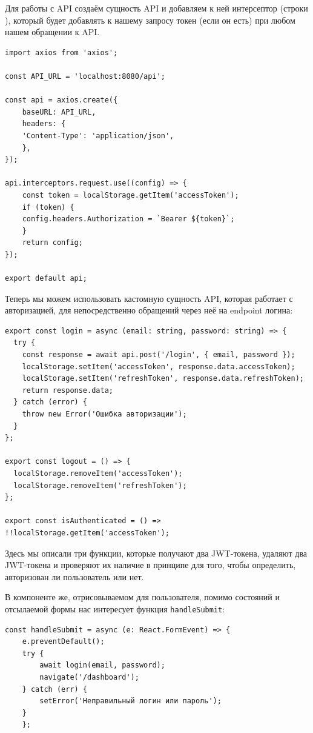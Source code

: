 \documentclass[diploma]{SCWorks}
\begin{document}
Для работы с API создаём сущность API и добавляем к ней интерсептор 
(строки ), который
будет добавлять к нашему запросу токен (если он есть) при любом нашем обращении
к API.

\begin{verbatim}
import axios from 'axios';

const API_URL = 'localhost:8080/api';

const api = axios.create({
    baseURL: API_URL,
    headers: {
    'Content-Type': 'application/json',
    },
});

api.interceptors.request.use((config) => {
    const token = localStorage.getItem('accessToken');
    if (token) {
    config.headers.Authorization = `Bearer ${token}`;
    }
    return config;
});

export default api;    
\end{verbatim}

Теперь мы можем использовать кастомную сущность API, которая работает 
с авторизацией, для непосредственно обращений через неё на endpoint логина:

\begin{verbatim}
export const login = async (email: string, password: string) => {
  try {
    const response = await api.post('/login', { email, password });
    localStorage.setItem('accessToken', response.data.accessToken);
    localStorage.setItem('refreshToken', response.data.refreshToken);
    return response.data;
  } catch (error) {
    throw new Error('Ошибка авторизации');
  }
};

export const logout = () => {
  localStorage.removeItem('accessToken');
  localStorage.removeItem('refreshToken');
};

export const isAuthenticated = () => !!localStorage.getItem('accessToken');
\end{verbatim}

Здесь мы описали три функции, которые получают два JWT-токена, удаляют два 
JWT-токена и проверяют их наличие в принципе для того, чтобы определить, 
авторизован ли пользователь или нет.

В компоненте же, отрисовываемом для пользователя, помимо состояний и отсылаемой 
формы нас интересует функция \texttt{handleSubmit}:

\begin{verbatim}
const handleSubmit = async (e: React.FormEvent) => {
    e.preventDefault();
    try {
        await login(email, password);
        navigate('/dashboard');
    } catch (err) {
        setError('Неправильный логин или пароль');
    }
    };
\end{verbatim}
\end{document}
